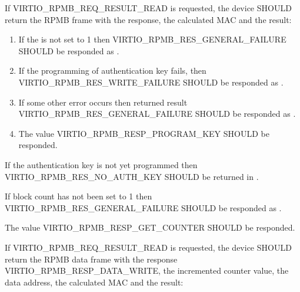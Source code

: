 
If VIRTIO_RPMB_REQ_RESULT_READ is requested, the device SHOULD return the
RPMB frame with the response, the calculated MAC and the result:

\begin{enumerate}
\item If the  is not set to 1 then
   VIRTIO_RPMB_RES_GENERAL_FAILURE SHOULD be responded as .

\item If the programming of authentication key fails,
   then VIRTIO_RPMB_RES_WRITE_FAILURE SHOULD be responded as .

\item If some other error occurs then returned result
   VIRTIO_RPMB_RES_GENERAL_FAILURE SHOULD be responded as .

\item The  value VIRTIO_RPMB_RESP_PROGRAM_KEY SHOULD be responded.
\end{enumerate}


If the authentication key is not yet programmed then VIRTIO_RPMB_RES_NO_AUTH_KEY
SHOULD be returned in .

If block count has not been set to 1 then VIRTIO_RPMB_RES_GENERAL_FAILURE
SHOULD be responded as .

The  value VIRTIO_RPMB_RESP_GET_COUNTER SHOULD be responded.


If VIRTIO_RPMB_REQ_RESULT_READ is requested, the device SHOULD return the RPMB data
frame with the response VIRTIO_RPMB_RESP_DATA_WRITE, the incremented counter value,
the data address, the calculated MAC and the result:

